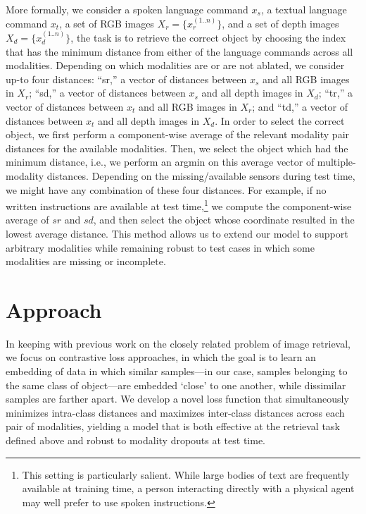 \documentclass[sigconf,natbib=true,anonymous=true]{acmart}
\begin{document}
More formally, we consider a spoken language command $x_s$, a textual language command $x_t$, a set of RGB images $X_r = \{x_r^{(1..n)}\}$, and a set of depth images $X_d = \{x_d^{(1..n)}\}$, the task is to retrieve the correct object by choosing the index that has the minimum distance from either of the language commands across all modalities.
Depending on which modalities are or are not ablated, we consider up-to four distances: ``sr,'' a vector of distances between $x_s$ and all RGB images in $X_r$; ``sd,'' a vector of distances between $x_s$ and all depth images in $X_d$; ``tr,'' a vector of distances between $x_t$ and all RGB images in $X_r$; and ``td,'' a vector of distances between $x_t$ and all depth images in $X_d$. In order to select the correct object, we first perform a component-wise average of the relevant modality pair distances for the available modalities. Then, we select the object which had the minimum distance, i.e., we perform an argmin on this average vector of multiple-modality distances. Depending on the missing/available sensors during test time, we might have any combination of these four distances. For example, if no written instructions are available at test time,\footnote{This setting is particularly salient. While large bodies of text are frequently available at training time, a person interacting directly with a physical agent may well prefer to use spoken instructions.} we compute the component-wise average of $sr$ and $sd$, and then select the object whose coordinate resulted in the lowest average distance. This method allows us to extend our model to support arbitrary modalities while remaining robust to test cases in which some modalities are missing or incomplete. 



\section{Approach}
\label{sec:Method}

In keeping with previous work on the closely related problem of image retrieval, we focus on contrastive loss approaches, in which the goal is to learn an embedding of data in which similar samples---in our case, samples belonging to the same class of object---are embedded `close' to one another, while dissimilar samples are farther apart. We develop a novel loss function that simultaneously minimizes intra-class distances and maximizes inter-class distances across each pair of modalities, yielding a model that is both effective at the retrieval task defined above and robust to modality dropouts at test time.
\end{document}
